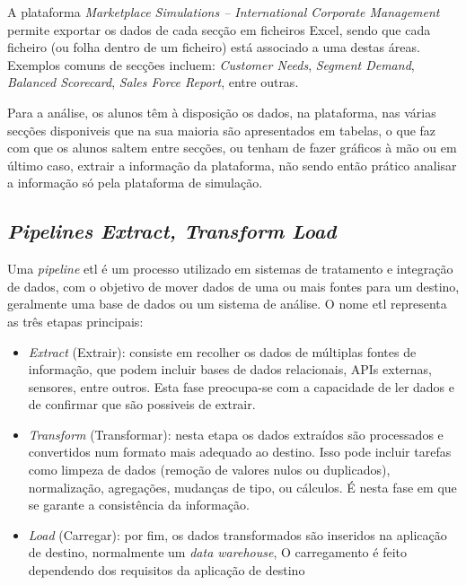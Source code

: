 A plataforma \textit{Marketplace Simulations – International Corporate Management} permite exportar os dados de cada secção em ficheiros Excel, sendo que cada ficheiro (ou folha dentro de um ficheiro) está associado a uma destas áreas. Exemplos comuns de secções incluem: \textit{Customer Needs}, \textit{Segment Demand}, \textit{Balanced Scorecard}, \textit{Sales Force Report}, entre outras.


Para a análise, os alunos têm à disposição os dados, na plataforma, nas várias secções disponiveis que na sua maioria são apresentados em tabelas, o que faz com que os alunos saltem entre secções, ou tenham de fazer gráficos à mão ou em último caso, extrair a informação da plataforma, não sendo então prático analisar a informação só pela plataforma de simulação.

\subsection{\textit{Pipelines Extract, Transform Load}}
\label{ch:etl}

Uma \textit{pipeline} \gls{etl} é um processo utilizado em sistemas de tratamento e integração de dados, com o objetivo de mover dados de uma ou mais fontes para um destino, geralmente uma base de dados ou um sistema de análise. O nome \gls{etl} representa as três etapas principais:

\begin{itemize}
  \item \textit{Extract} (Extrair): consiste em recolher os dados de múltiplas fontes de informação, que podem incluir bases de dados relacionais, APIs externas, sensores, entre outros. Esta fase preocupa-se com a capacidade de ler dados e de confirmar que são possiveis de extrair.
  
  \item \textit{Transform} (Transformar): nesta etapa os dados extraídos são processados e convertidos num formato mais adequado ao destino. Isso pode incluir tarefas como limpeza de dados (remoção de valores nulos ou duplicados), normalização, agregações, mudanças de tipo, ou cálculos. É nesta fase em que se garante a consistência da informação.

  \item \textit{Load} (Carregar): por fim, os dados transformados são inseridos na aplicação de destino, normalmente um \textit{data warehouse},  O carregamento é feito dependendo dos requisitos da aplicação de destino

\end{itemize}

